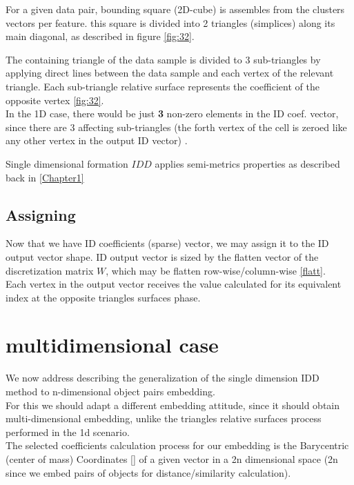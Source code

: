 		
		
		
		
		
		
		For a given data pair, bounding square (2D-cube) is assembles from the clusters vectors per feature.
		this square is divided into 2 triangles (simplices) along its main diagonal, as described in figure \ref{fig:32}.
		
		The containing triangle of the data sample is divided to 3 sub-triangles by applying direct lines between the data sample and each vertex of the relevant triangle. Each sub-triangle relative surface represents the coefficient of the opposite vertex \ref{fig:32}. \\ 
		In the 1D case, there would be just \textbf{3} non-zero elements in the ID coef. vector, since there are 3 affecting sub-triangles (the forth vertex of the cell is zeroed like any other vertex in the output ID vector) .
				
		Single dimensional formation $IDD$ applies semi-metrics properties as described back in \ref{Chapter1}
		
			
	\subsection{Assigning}
	Now that we have ID coefficients (sparse) vector, we may assign it to the ID output vector shape.
	ID output vector is sized by the flatten vector of the discretization matrix $W$, which may be flatten row-wise/column-wise \ref{flatt}.\\
	Each vertex in the output vector receives the value calculated for its equivalent index at the opposite triangles surfaces phase.
	


\section{multidimensional case}

We now address describing the generalization of the single dimension IDD method to n-dimensional object pairs embedding. \\
For this we should adapt a different embedding attitude, since it should obtain multi-dimensional embedding, unlike the triangles relative surfaces process performed in the 1d scenario.  \\
The selected coefficients calculation process for our embedding is the Barycentric (center of mass) Coordinates [] of a given vector in a 2n dimensional space (2n since we embed pairs of objects for distance/similarity calculation).

